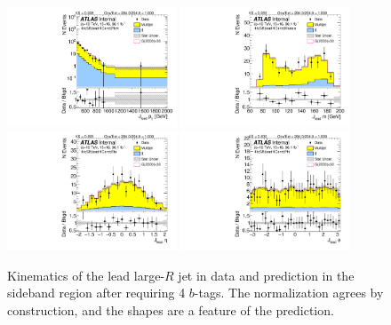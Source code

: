 \begin{figure}[htbp!]
\begin{center}
\includegraphics[angle=270, width=0.45\textwidth]{./figures/boosted/Sideband/b77_FourTag_Sideband_leadHCand_Pt_m_1.pdf}
\includegraphics[angle=270, width=0.45\textwidth]{./figures/boosted/Sideband/b77_FourTag_Sideband_leadHCand_Mass_s.pdf}\\
\includegraphics[angle=270, width=0.45\textwidth]{./figures/boosted/Sideband/b77_FourTag_Sideband_leadHCand_Eta.pdf}
\includegraphics[angle=270, width=0.45\textwidth]{./figures/boosted/Sideband/b77_FourTag_Sideband_leadHCand_Phi.pdf}
  \caption{Kinematics of the lead large-$R$ jet in data and prediction in the sideband region after requiring 4 $b$-tags. The normalization agrees by construction, and the shapes are a feature of the prediction.}
  \label{fig:boosted-4b-sideband-ak10-lead}
\end{center}
\end{figure}

